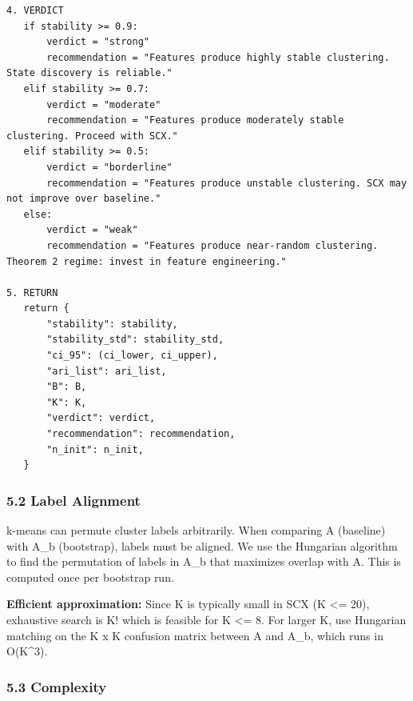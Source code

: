 \documentclass[
  12pt,
]{article}
\begin{document}
\begin{verbatim}
4. VERDICT
   if stability >= 0.9:
       verdict = "strong"
       recommendation = "Features produce highly stable clustering. State discovery is reliable."
   elif stability >= 0.7:
       verdict = "moderate"
       recommendation = "Features produce moderately stable clustering. Proceed with SCX."
   elif stability >= 0.5:
       verdict = "borderline"
       recommendation = "Features produce unstable clustering. SCX may not improve over baseline."
   else:
       verdict = "weak"
       recommendation = "Features produce near-random clustering. Theorem 2 regime: invest in feature engineering."

5. RETURN
   return {
       "stability": stability,
       "stability_std": stability_std,
       "ci_95": (ci_lower, ci_upper),
       "ari_list": ari_list,
       "B": B,
       "K": K,
       "verdict": verdict,
       "recommendation": recommendation,
       "n_init": n_init,
   }
\end{verbatim}

\subsubsection{5.2 Label Alignment}\label{label-alignment}

k-means can permute cluster labels arbitrarily. When comparing A
(baseline) with A\_b (bootstrap), labels must be aligned. We use the
Hungarian algorithm to find the permutation of labels in A\_b that
maximizes overlap with A. This is computed once per bootstrap run.

\textbf{Efficient approximation:} Since K is typically small in SCX (K
\textless= 20), exhaustive search is K! which is feasible for K
\textless= 8. For larger K, use Hungarian matching on the K x K
confusion matrix between A and A\_b, which runs in O(K\^{}3).

\subsubsection{5.3 Complexity}\label{complexity}
\end{document}
